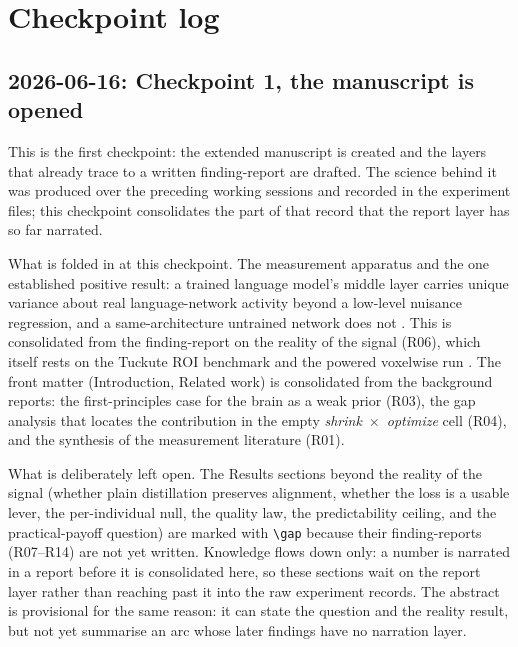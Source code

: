 %

\section*{Checkpoint log}

\subsection*{2026-06-16: Checkpoint 1, the manuscript is opened}

This is the first checkpoint: the extended manuscript is created and the layers that already trace to a written finding-report are drafted.
The science behind it was produced over the preceding working sessions and recorded in the experiment files; this checkpoint consolidates the part of that record that the report layer has so far narrated.

What is folded in at this checkpoint.
The measurement apparatus and the one established positive result: a trained language model's middle layer carries unique variance about real language-network activity beyond a low-level nuisance regression, and a same-architecture untrained network does not .
This is consolidated from the finding-report on the reality of the signal (R06), which itself rests on the Tuckute ROI benchmark  and the powered voxelwise run .
The front matter (Introduction, Related work) is consolidated from the background reports: the first-principles case for the brain as a weak prior (R03), the gap analysis that locates the contribution in the empty \emph{shrink}~$\times$~\emph{optimize} cell (R04), and the synthesis of the measurement literature (R01).

What is deliberately left open.
The Results sections beyond the reality of the signal (whether plain distillation preserves alignment, whether the loss is a usable lever, the per-individual null, the quality law, the predictability ceiling, and the practical-payoff question) are marked with \verb|\gap| because their finding-reports (R07--R14) are not yet written.
Knowledge flows down only: a number is narrated in a report before it is consolidated here, so these sections wait on the report layer rather than reaching past it into the raw experiment records.
The abstract is provisional for the same reason: it can state the question and the reality result, but not yet summarise an arc whose later findings have no narration layer.

